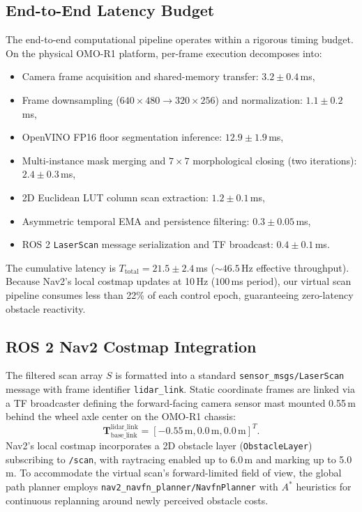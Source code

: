 \documentclass{ieeeaccess}
\begin{document}
\subsection{End-to-End Latency Budget}
\label{subsec:latency_budget}
The end-to-end computational pipeline operates within a rigorous timing budget. On the physical OMO-R1 platform, per-frame execution decomposes into:
\begin{itemize}
  \item Camera frame acquisition and shared-memory transfer: $3.2 \pm 0.4$\,ms,
  \item Frame downsampling ($640\times480 \rightarrow 320\times256$) and normalization: $1.1 \pm 0.2$\,ms,
  \item OpenVINO FP16 floor segmentation inference: $12.9 \pm 1.9$\,ms,
  \item Multi-instance mask merging and $7\times7$ morphological closing (two iterations): $2.4 \pm 0.3$\,ms,
  \item 2D Euclidean LUT column scan extraction: $1.2 \pm 0.1$\,ms,
  \item Asymmetric temporal EMA and persistence filtering: $0.3 \pm 0.05$\,ms,
  \item ROS 2 \texttt{LaserScan} message serialization and TF broadcast: $0.4 \pm 0.1$\,ms.
\end{itemize}
The cumulative latency is $T_{\mathrm{total}} = 21.5 \pm 2.4$\,ms ($\sim 46.5$\,Hz effective throughput). Because Nav2's local costmap updates at 10\,Hz ($100$\,ms period), our virtual scan pipeline consumes less than 22\% of each control epoch, guaranteeing zero-latency obstacle reactivity.

\subsection{ROS 2 Nav2 Costmap Integration}
The filtered scan array $S$ is formatted into a standard \texttt{sensor\_msgs/LaserScan} message with frame identifier \texttt{lidar\_link}. Static coordinate frames are linked via a TF broadcaster defining the forward-facing camera sensor mast mounted 0.55\,m behind the wheel axle center on the OMO-R1 chassis:
\begin{equation}
  \mathbf{T}_{\mathrm{base\_link}}^{\mathrm{lidar\_link}} = [-0.55\,\text{m}, 0.0\,\text{m}, 0.0\,\text{m}]^T.
\end{equation}
Nav2's local costmap incorporates a 2D obstacle layer (\texttt{ObstacleLayer}) subscribing to \texttt{/scan}, with raytracing enabled up to 6.0\,m and marking up to 5.0\,m. To accommodate the virtual scan's forward-limited field of view, the global path planner employs \texttt{nav2\_navfn\_planner}\allowbreak\texttt{/NavfnPlanner} with $A^*$ heuristics for continuous replanning around newly perceived obstacle costs.
\end{document}
